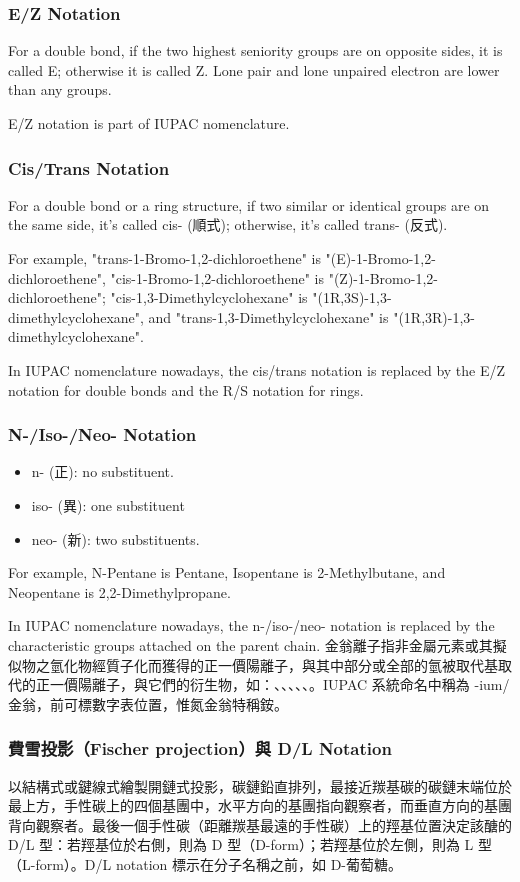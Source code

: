 \documentclass[a4paper,12pt]{report}
\begin{document}
\subsubsection{E/Z Notation}
For a double bond, if the two highest seniority groups are on opposite sides, it is called E; otherwise it is called Z.  Lone pair and lone unpaired electron are lower than any groups.

E/Z notation is part of IUPAC nomenclature.
\subsubsection{Cis/Trans Notation}
For a double bond or a ring structure, if two similar or identical groups are on the same side, it's called cis- (順式); otherwise, it's called trans- (反式).

For example, "trans-1-Bromo-1,2-dichloroethene" is "(E)-1-Bromo-1,2-dichloroethene", "cis-1-Bromo-1,2-dichloroethene" is "(Z)-1-Bromo-1,2-dichloroethene"; "cis-1,3-Dimethylcyclohexane" is "(1R,3S)-1,3-dimethylcyclohexane", and "trans-1,3-Dimethylcyclohexane" is "(1R,3R)-1,3-dimethylcyclohexane".

In IUPAC nomenclature nowadays, the cis/trans notation is replaced by the E/Z notation for double bonds and the R/S notation for rings.
\subsubsection{N-/Iso-/Neo- Notation}
\begin{itemize}
\item n- (正): no substituent.
\item iso- (異): one substituent
\item neo- (新): two substituents.
\end{itemize}
For example, N-Pentane is Pentane, Isopentane is 2-Methylbutane, and Neopentane is 2,2-Dimethylpropane.

In IUPAC nomenclature nowadays, the n-/iso-/neo- notation is replaced by the characteristic groups attached on the parent chain.
金翁離子指非金屬元素或其擬似物之氫化物經質子化而獲得的正一價陽離子，與其中部分或全部的氫被取代基取代的正一價陽離子，與它們的衍生物，如：、、、、、。IUPAC 系統命名中稱為 -ium/金翁，前可標數字表位置，惟氮金翁特稱銨。
\subsubsection{費雪投影（Fischer projection）與 D/L Notation}
以結構式或鍵線式繪製開鏈式投影，碳鏈鉛直排列，最接近羰基碳的碳鏈末端位於最上方，手性碳上的四個基團中，水平方向的基團指向觀察者，而垂直方向的基團背向觀察者。最後一個手性碳（距離羰基最遠的手性碳）上的羥基位置決定該醣的 D/L 型：若羥基位於右側，則為 D 型（D-form）；若羥基位於左側，則為 L 型（L-form）。D/L notation 標示在分子名稱之前，如 D-葡萄糖。
\end{document}
